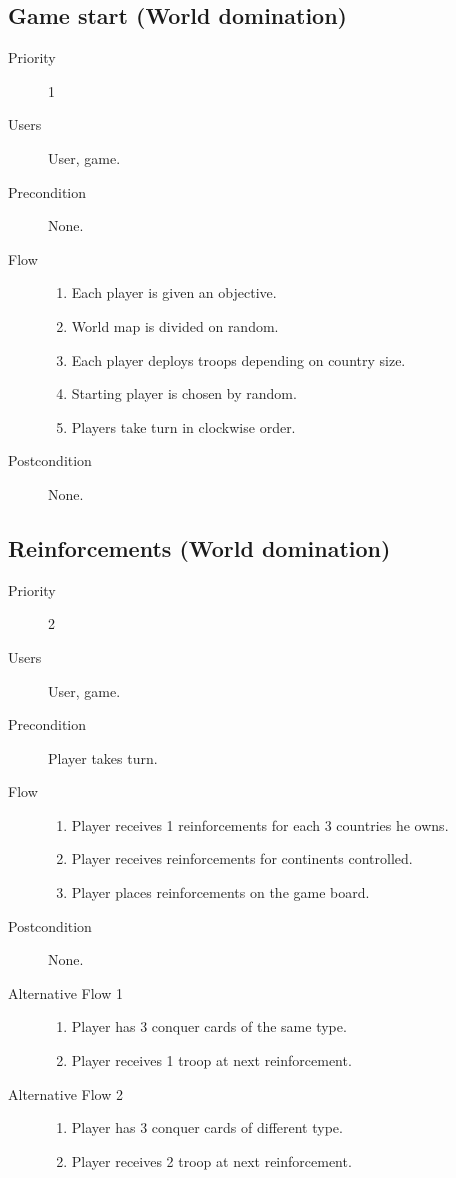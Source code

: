 \documentclass[12pt,a4paper]{article}
\begin{document}
\subsection{Game start (World domination)}
\begin{description}
\item[Priority] 1
\item[Users] User, game.
\item[Precondition] None.
\item[Flow]\mbox{}
  \begin{enumerate}
  \item Each player is given an objective.
  \item World map is divided on random.
  \item Each player deploys troops depending on country size.
  \item Starting player is chosen by random.
  \item Players take turn in clockwise order.
  \end{enumerate}
\item[Postcondition] None.
\end{description}

\subsection{Reinforcements (World domination)}
\begin{description}
\item[Priority] 2
\item[Users] User, game.
\item[Precondition] Player takes turn.
\item[Flow]\mbox{}
  \begin{enumerate}
  \item Player receives 1 reinforcements for each 3 countries he owns.
  \item Player receives reinforcements for continents controlled.
  \item Player places reinforcements on the game board.
  \end{enumerate}
\item[Postcondition] None.
\item[Alternative Flow 1]\mbox{}
  \begin{enumerate}
  \item Player has 3 conquer cards of the same type.
  \item Player receives 1 troop at next reinforcement.
  \end{enumerate}
\item[Alternative Flow 2]\mbox{}
  \begin{enumerate}
  \item Player has 3 conquer cards of different type.
  \item Player receives 2 troop at next reinforcement.
  \end{enumerate}
\end{description}
\end{document}

